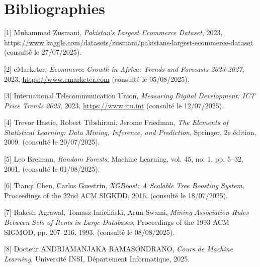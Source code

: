\documentclass[a4paper,12pt]{article}
\begin{document}
\newpage



\chapter*{Bibliographies}

[1] Muhammad Zusmani, \textit{Pakistan's Largest Ecommerce Dataset}, 2023, \url{https://www.kaggle.com/datasets/zusmani/pakistans-largest-ecommerce-dataset} (consulté le 27/07/2025).

[2] eMarketer, \textit{Ecommerce Growth in Africa: Trends and Forecasts 2023-2027}, 2023, \url{https://www.emarketer.com} (consulté le 05/08/2025).

[3] International Telecommunication Union, \textit{Measuring Digital Development: ICT Price Trends 2023}, 2023, \url{https://www.itu.int} (consulté le 12/07/2025).

[4] Trevor Hastie, Robert Tibshirani, Jerome Friedman, \textit{The Elements of Statistical Learning: Data Mining, Inference, and Prediction}, Springer, 2e édition, 2009. (consulté le 20/07/2025).

[5] Leo Breiman, \textit{Random Forests}, Machine Learning, vol. 45, no. 1, pp. 5–32, 2001. (consulté le 01/08/2025).

[6] Tianqi Chen, Carlos Guestrin, \textit{XGBoost: A Scalable Tree Boosting System}, Proceedings of the 22nd ACM SIGKDD, 2016. (consulté le 18/07/2025).

[7] Rakesh Agrawal, Tomasz Imieliński, Arun Swami, \textit{Mining Association Rules Between Sets of Items in Large Databases}, Proceedings of the 1993 ACM SIGMOD, pp. 207–216, 1993. (consulté le 08/08/2025).

[8] Docteur ANDRIAMANJAKA RAMASONDRANO, \textit{Cours de Machine Learning}, Université INSI, Département Informatique, 2025.

\newpage
\pagestyle{plain}
\listoftables
\newpage
\pagestyle{plain}
\listoffigures
\newpage
\pagestyle{plain}
\tableofcontents
\newpage
\end{document}
